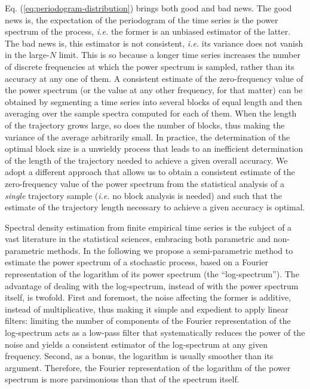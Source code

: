 Eq. (\ref{eq:periodogram-distribution}) brings both good and bad news. The good news is, the expectation of the periodogram of the time series is the power spectrum of the process, \emph{i.e.} the former is an unbiased estimator of the latter. The bad news is, this estimator is not consistent, \emph{i.e.} its variance does not vanish in the large-$N$ limit. This is so because a longer time series increases the number of discrete frequencies at which the power spectrum is sampled, rather than its accuracy at any one of them.  A consistent estimate of the zero-frequency value of the power spectrum (or the value at any other frequency, for that matter) can be obtained by segmenting a time series into several blocks of equal length and then averaging over the sample spectra computed for each of them. When the length of the trajectory grows large, so does the number of blocks, thus making the variance of the average arbitrarily small. In practice, the determination of the optimal block size is a unwieldy process that leads to an inefficient determination of the length of the trajectory needed to achieve a given overall accuracy. We adopt a different approach that allows us to obtain a consistent estimate of the zero-frequency value of the power spectrum from the statistical analysis of a \emph{single} trajectory sample (\emph{i.e.} no block analysis is needed) and such that the estimate of the trajectory length necessary to achieve a given accuracy is optimal.

Spectral density estimation from finite empirical time series is the subject of a vast literature in the statistical sciences, embracing both parametric and non-parametric methods.\cite{Stoica2005} In the following we propose a semi-parametric method to estimate the power spectrum of a stochastic process, based on a Fourier representation of the logarithm of its power spectrum (the ``log-spectrum''). The advantage of dealing with the log-spectrum, instead of with the power spectrum itself, is twofold. First and foremost, the noise affecting the former is additive, instead of multiplicative, thus making it simple and expedient to apply linear filters: limiting the number of components of the Fourier representation of the log-spectrum acts as a low-pass filter that systematically reduces the power of the noise and yields a consistent estimator of the log-spectrum at any given frequency. Second, as a bonus, the logarithm is usually smoother than its argument. Therefore, the Fourier representation of the logarithm of the power spectrum is more parsimonious than that of the spectrum itself.
 
